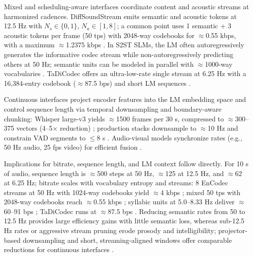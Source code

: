 \documentclass{article}
\begin{document}
Mixed and scheduling-aware interfaces coordinate content and acoustic streams at harmonized cadences. DiffSoundStream emits semantic and acoustic tokens at 12.5 Hz with $N_{s} \in \{0,1\}$, $N_{a} \in [1,8]$; a common point uses 1 semantic + 3 acoustic tokens per frame (50 tps) with 2048-way codebooks for $\approx$0.55 kbps, with a maximum $\approx$1.2375 kbps \cite{yang2025diffsoundstreamefficientspeechtokenizati}. In S2ST SLMs, the LM often autoregressively generates the informative codec stream while non-autoregressively predicting others at 50 Hz; semantic units can be modeled in parallel with $\approx$1000-way vocabularies \cite{peng2024mslms2stmultitaskspeechlanguagemodeltext}. TaDiCodec offers an ultra-low-rate single stream at 6.25 Hz with a 16,384-entry codebook ($\approx$87.5 bps) and short LM sequences \cite{wang2025tadicodectextawarediffusionspeechtokeniz}.

Continuous interfaces project encoder features into the LM embedding space and control sequence length via temporal downsampling and boundary-aware chunking: Whisper large-v3 yields $\approx$1500 frames per 30 s, compressed to $\approx$300--375 vectors (4--5$\times$ reduction) \cite{nguyen2025qwenvsgemmaintegrationwhispercomparative}; production stacks downsample to $\approx$10 Hz and constrain VAD segments to $\le$8 s \cite{li2025seewossubmissionmlcslmlessonslearnedspee}. Audio-visual models synchronize rates (e.g., 50 Hz audio, 25 fps video) for efficient fusion \cite{sadok2025vectorquantizedmaskedautoencoderaudiovis}.

Implications for bitrate, sequence length, and LM context follow directly. For 10 s of audio, sequence length is $\approx$500 steps at 50 Hz, $\approx$125 at 12.5 Hz, and $\approx$62 at 6.25 Hz; bitrate scales with vocabulary entropy and streams: 8 EnCodec streams at 50 Hz with 1024-way codebooks yield $\approx$4 kbps \cite{peng2024mslms2stmultitaskspeechlanguagemodeltext}; mixed 50 tps with 2048-way codebooks reach $\approx$0.55 kbps \cite{yang2025diffsoundstreamefficientspeechtokenizati}; syllabic units at 5.0--8.33 Hz deliver $\approx$60--91 bps \cite{baade2024syllablelmlearningcoarsesemanticunitsspe}; TaDiCodec runs at $\approx$87.5 bps \cite{wang2025tadicodectextawarediffusionspeechtokeniz}. Reducing semantic rates from 50 to 12.5 Hz provides large efficiency gains with little semantic loss, whereas sub-12.5 Hz rates or aggressive stream pruning erode prosody and intelligibility; projector-based downsampling and short, streaming-aligned windows offer comparable reductions for continuous interfaces \cite{zeng2024scalingspeechtextpretrainingsyntheticint,nguyen2025qwenvsgemmaintegrationwhispercomparative,li2025seewossubmissionmlcslmlessonslearnedspee}.
\end{document}
